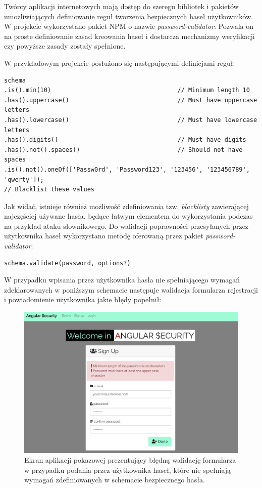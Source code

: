 Twórcy aplikacji internetowych mają dostęp do szeregu bibliotek i pakietów umożliwiających definiowanie reguł tworzenia bezpiecznych haseł użytkowników. W projekcie wykorzystano pakiet NPM o nazwie \textit{password-validator}. Pozwala on na proste definiowanie zasad kreowania haseł i dostarcza mechanizmy weryfikacji czy powyższe zasady zostały spełnione. 

W przykładowym projekcie posłużono się następującymi definicjami reguł:

\begin{verbatim}
schema
.is().min(10)                                   // Minimum length 10
.has().uppercase()                              // Must have uppercase letters
.has().lowercase()                              // Must have lowercase letters
.has().digits()                                 // Must have digits
.has().not().spaces()                           // Should not have spaces
.is().not().oneOf(['Passw0rd', 'Password123', '123456', '123456789', 'qwerty']); 
// Blacklist these values
\end{verbatim}
 
Jak widać, istnieje również możliwość zdefiniowania tzw. \textit{blacklisty} zawierającej najczęściej używane hasła, będące łatwym elementem do wykorzystania podczas na przykład ataku słownikowego. Do walidacji poprawności przesyłanych przez użytkownika haseł wykorzystano metodę oferowaną przez pakiet \textit{password-validator}:

\begin{verbatim}
schema.validate(password, options?)
\end{verbatim}

W przypadku wpisania przez użytkownika hasła nie spełniającego wymagań zdeklarowanych w poniższym schemacie następuje walidacja formularza rejestracji i powiadomienie użytkownika jakie błędy popełnił:

\begin{figure}[h]
	\centering\includegraphics[scale=0.4]{images/security/password-bad-validation.png}
	\caption{Ekran aplikacji pokazowej prezentujący błędną walidację formularza w przypadku podania przez użytkownika haseł, które nie spełniają wymagań zdefiniowanych w schemacie bezpiecznego hasła.}
	\label{Rys:badpassvalid}
\end{figure}


